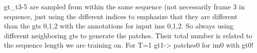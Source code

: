 gt\_t3-5 are sampled from within the same sequence (not necessarily frame 3 in sequence, just using the different indices to emphasize that they are different than the gts 0,1,2 with the annotations for input ims 0,1,2. So always using different neighboring gts to generate the patches. Their total number is related to the sequence length we are training on. For T=1 gt1-> patches0 for im0 with gt0!
